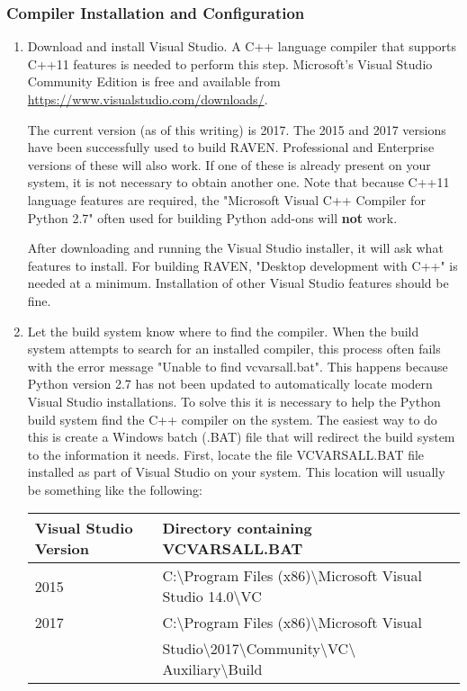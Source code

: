 \subsubsection{Compiler Installation and Configuration}
\begin{enumerate}
	\item Download and install Visual Studio.  A C++ language compiler that supports C++11 features 
		is needed to perform this step. Microsoft's Visual Studio Community Edition is free and 
		available from \url{https://www.visualstudio.com/downloads/}.  

		The current version (as of this writing) is 2017. The 2015 and 2017 versions have been 
		successfully used to build RAVEN. Professional and Enterprise versions of these will 
		also work. If one of these is already present on your system, it is not necessary to 
		obtain another one. Note that because C++11 language features are required, the 
		"Microsoft Visual C++ Compiler for Python 2.7" often used for building Python
		add-ons will {\bf not} work.

		After downloading and running the Visual Studio installer, it will ask what features 
		to install. For building RAVEN, "Desktop development with C++" is needed at a minimum. 
		Installation of other Visual Studio features should be fine.

	\item Let the build system know where to find the compiler.  When the build system attempts 
		to search for an installed compiler, this process often fails with the error message 
		"Unable to find vcvarsall.bat".  This happens because Python version 2.7 has not been 
		updated to automatically locate modern Visual Studio installations. To solve this it 
		is necessary to help the Python build system find the C++ compiler on the system. 
		The easiest way to do this is create a Windows batch (.BAT) file that will redirect 
		the build system to the information it needs. First, locate the file VCVARSALL.BAT 
		file installed as part of Visual Studio on your system. This location will usually 
		be something like the following: 
		\smallskip

\begin{tabular}{| l | l |}
	\hline
	{\bf Visual Studio Version} & {\bf Directory containing VCVARSALL.BAT} \\\hline			
	2015 & C:\textbackslash Program Files (x86)\textbackslash Microsoft Visual Studio 14.0\textbackslash VC \\\hline
	2017 & C:\textbackslash Program Files (x86)\textbackslash Microsoft Visual \\
               & Studio\textbackslash 2017\textbackslash Community\textbackslash VC\textbackslash
                Auxiliary\textbackslash Build \\\hline
\end{tabular}


\end{enumerate}
